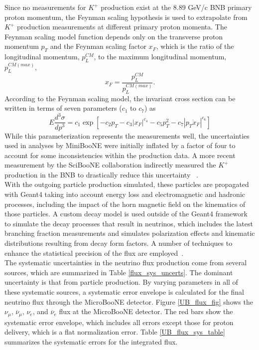 Since no measurements for $K^+$ production exist at the 8.89 GeV/c BNB primary proton momentum, the Feynman scaling hypothesis is used to extrapolate from $K^+$ production measurements at different primary proton momenta. The Feynman scaling model function depends only on the transverse proton momentum $p_T$ and the Feynman scaling factor $x_F$, which is the ratio of the longitudinal momentum, $p_L^{CM}$, to the maximum longitudinal momentum, $p_L^{CM(max)}$,
\begin{equation}\label{feynmanscalingequation}
x_F = \frac{p_L^{CM}}{p_L^{CM(max)}}.
\end{equation}
According to the Feynman scaling model, the invariant cross section can be written in terms of seven parameters ($c_1$ to $c_7$) as
\begin{equation}\label{feynmanscaling_crosssec}
E\frac{d^3\sigma}{dp^3} = c_1\exp[-c_2p_T-c_3|x_F|^{c_4}-c_5p_T^2-c_7|p_T\dot x_F|^{c_6}]
\end{equation}
While this parameterization represents the measurements well, the uncertainties used in analyses by MiniBooNE were initially inflated by a factor of four to account for some inconsistencies within the production data. A more recent measurement by the SciBooNE collaboration indirectly measured the $K^+$ production in the BNB to drastically reduce this uncertainty ~\cite{gary_kaon_production_paper}.\\

With the outgoing particle production simulated, these particles are propagated with Geant4 taking into account energy loss and electromagnetic and hadronic processes, including the impact of the horn magnetic field on the kinematics of those particles. A custom decay model is used outside of the Geant4 framework to simulate the decay processes that result in neutrinos, which includes the latest branching fraction measurements and simulates polarization effects and kinematic distributions resulting from decay form factors. A number of techniques to enhance the statistical precision of the flux are employed~\cite{MBFluxPaper}.\\

The systematic uncertainties in the neutrino flux production come from several sources, which are summarized in Table \ref{flux_sys_uncerts}. The dominant uncertainty is that from particle production. By varying parameters in all of these systematic sources, a systematic error envelope is calculated for the final neutrino flux through the MicroBooNE detector. Figure \ref{UB_flux_fig} shows the $\nu_\mu$, $\overline{\nu}_\mu$, $\nu_e$, and $\overline{\nu}_e$ flux at the MicroBooNE detector. The red bars show the systematic error envelope, which includes all errors except those for proton delivery, which is a flat normalization error. Table \ref{UB_flux_sys_table} summarizes the systematic errors for the integrated flux.

